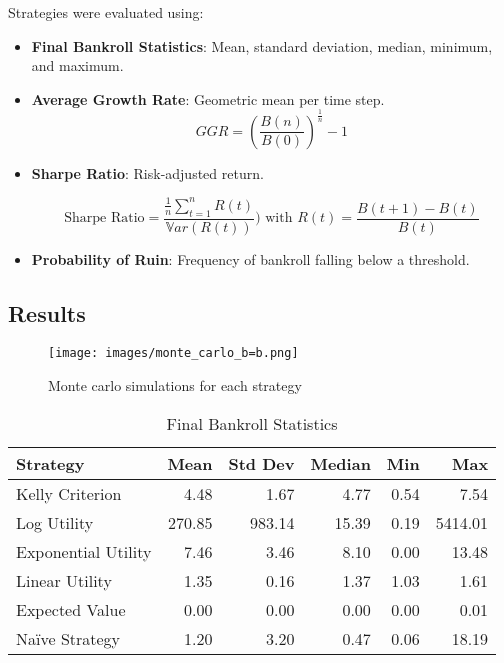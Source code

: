 Strategies were evaluated using:

\begin{itemize}
    \item \textbf{Final Bankroll Statistics}: Mean, standard deviation, median, minimum, and maximum.
    \item \textbf{Average Growth Rate}: Geometric mean per time step. 
    \[GGR = \left( \frac{B(n)}{B(0)} \right)^{\frac{1}{n}} - 1\]

    \item \textbf{Sharpe Ratio}: Risk-adjusted return.

    \[\text{Sharpe Ratio} = \frac{\frac{1}{n} \sum_{t=1}^{n} R(t)}{\mathbb{V}ar(R(t))}) \text{   with   } R(t) = \frac{B(t+1) - B(t)}{B(t)}\]
    
    \item \textbf{Probability of Ruin}: Frequency of bankroll falling below a threshold.
\end{itemize}

\subsection{Results}

\begin{figure}[H]
    \centering
    \texttt{[image: images/monte\_carlo\_b=b.png]}
    \caption{Monte carlo simulations for each strategy}
    \label{fig:monte_carlo}
\end{figure}


\begin{table}[H]
\centering
\caption{Final Bankroll Statistics}
\label{tab:final_bankroll}
\begin{tabular}{lrrrrr}
\toprule
\textbf{Strategy} & \textbf{Mean} & \textbf{Std Dev} & \textbf{Median} & \textbf{Min} & \textbf{Max} \\
\midrule
Kelly Criterion          & 4.48   & 1.67   & 4.77   & 0.54   & 7.54   \\
Log Utility              & 270.85 & 983.14 & 15.39  & 0.19   & 5414.01 \\
Exponential Utility      & 7.46   & 3.46   & 8.10   & 0.00   & 13.48  \\
Linear Utility           & 1.35   & 0.16   & 1.37   & 1.03   & 1.61   \\
Expected Value           & 0.00   & 0.00   & 0.00   & 0.00   & 0.01   \\
Naïve Strategy           & 1.20   & 3.20   & 0.47   & 0.06   & 18.19  \\
\bottomrule
\end{tabular}
\end{table}

